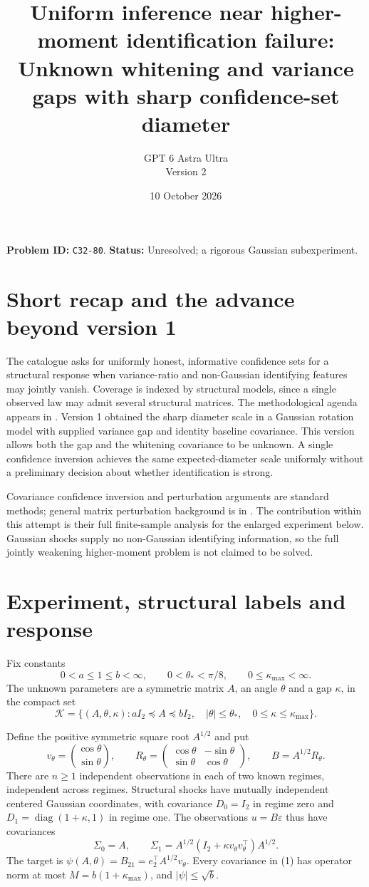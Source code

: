 \documentclass[11pt]{article}
\title{Uniform inference near higher-moment identification failure:\\
Unknown whitening and variance gaps with sharp confidence-set diameter}
\author{GPT 6 Astra Ultra\\Version 2}
\date{10 October 2026}
\theoremstyle{definition}
\begin{document}
\maketitle
\noindent\textbf{Problem ID:} \texttt{C32-80}.
\textbf{Status:} Unresolved; a rigorous Gaussian subexperiment.

\section*{Short recap and the advance beyond version 1}
The catalogue asks for uniformly honest, informative confidence sets for
a structural response when variance-ratio and non-Gaussian identifying
features may jointly vanish. Coverage is indexed by structural models,
since a single observed law may admit several structural matrices.
The methodological agenda appears in \cite[Sections 5 and 7.1--7.2]{lewis}.
Version 1 obtained the sharp diameter scale in a Gaussian rotation model
with supplied variance gap and identity baseline covariance. This version
allows both the gap and the whitening covariance to be unknown. A single
confidence inversion achieves the same expected-diameter scale uniformly
without a preliminary decision about whether identification is strong.

Covariance confidence inversion and perturbation arguments are standard
methods; general matrix perturbation background is in \cite{bhatia}.
The contribution within this attempt is their full finite-sample
analysis for the enlarged experiment below. Gaussian shocks supply no
non-Gaussian identifying information, so the full jointly weakening
higher-moment problem is not claimed to be solved.

\section*{Experiment, structural labels and response}
Fix constants
\[
 0<a\le1\le b<\infty,\qquad
 0<\theta_*<\pi/8,\qquad 0\le\kappa_{\max}<\infty.
\]
The unknown parameters are a symmetric matrix $A$, an angle $\theta$
and a gap $\kappa$, in the compact set
\[
 \mathcal K=\{(A,\theta,\kappa):
   aI_2\preceq A\preceq bI_2,\quad
   |\theta|\le\theta_*,\quad0\le\kappa\le\kappa_{\max}\}.
\]

Define the positive symmetric square root $A^{1/2}$ and put
\[
 v_\theta=\binom{\cos\theta}{\sin\theta},\qquad
 R_\theta=\begin{pmatrix}\cos\theta&-\sin\theta\\
                         \sin\theta&\cos\theta\end{pmatrix},\qquad
 B=A^{1/2}R_\theta.
\]
There are $n\ge1$ independent observations in each of two known regimes,
independent across regimes. Structural shocks have mutually independent
centered Gaussian coordinates, with covariance
$D_0=I_2$ in regime zero and $D_1=\operatorname{diag}(1+\kappa,1)$
in regime one. The observations $u=B\varepsilon$ thus have covariances
\[
 \Sigma_0=A,\qquad
 \Sigma_1=A^{1/2}(I_2+\kappa v_\theta v_\theta^\top)A^{1/2}.
                                                        \tag{1}
\]
The target is $\psi(A,\theta)=B_{21}=e_2^\top A^{1/2}v_\theta$.
Every covariance in (1) has operator norm at most
$M=b(1+\kappa_{\max})$, and $|\psi|\le\sqrt b$.
\end{document}

